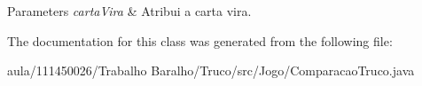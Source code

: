 \begin{DoxyParams}{Parameters}
{\em cartaVira} & Atribui a carta vira. \\
\hline
\end{DoxyParams}


The documentation for this class was generated from the following file:\begin{DoxyCompactItemize}
\item 
aula/111450026/Trabalho Baralho/Truco/src/Jogo/ComparacaoTruco.java\end{DoxyCompactItemize}
